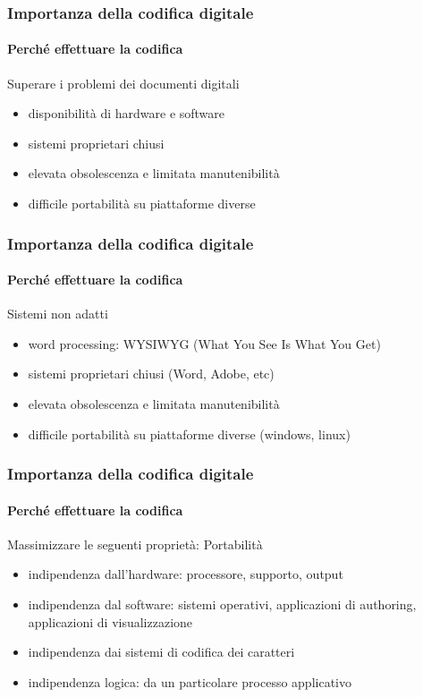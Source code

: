 \begin{frame}
	\frametitle{Importanza della codifica digitale}
	\framesubtitle{Perché effettuare la codifica}
	\addtocounter{nframe}{1}

	\begin{block}{Superare i problemi dei documenti digitali}
		\begin{itemize}
			\item disponibilità di hardware e software
			\item sistemi proprietari chiusi
			\item elevata obsolescenza e limitata manutenibilità
			\item difficile portabilità su piattaforme diverse
		\end{itemize}
	\end{block}

\end{frame}

\begin{frame}
	\frametitle{Importanza della codifica digitale}
	\framesubtitle{Perché effettuare la codifica}
	\addtocounter{nframe}{1}

	\begin{block}{Sistemi non adatti}
		\begin{itemize}
			\item word processing: WYSIWYG (What You See Is What You Get)
			\item sistemi proprietari chiusi (Word, Adobe, etc)
			\item elevata obsolescenza e limitata manutenibilità
			\item difficile portabilità su piattaforme diverse (windows, linux)
		\end{itemize}
	\end{block}

\end{frame}

\begin{frame}
	\frametitle{Importanza della codifica digitale}
	\framesubtitle{Perché effettuare la codifica}
	\addtocounter{nframe}{1}

	\begin{block}{Massimizzare le seguenti proprietà: Portabilità}
		\begin{itemize}
			\item indipendenza dall’hardware: processore, supporto, output
			\item indipendenza dal software: sistemi operativi, applicazioni di authoring, applicazioni di visualizzazione
			\item indipendenza dai sistemi di codifica dei caratteri
			\item indipendenza logica: da un particolare processo applicativo
		\end{itemize}
	\end{block}

\end{frame}




